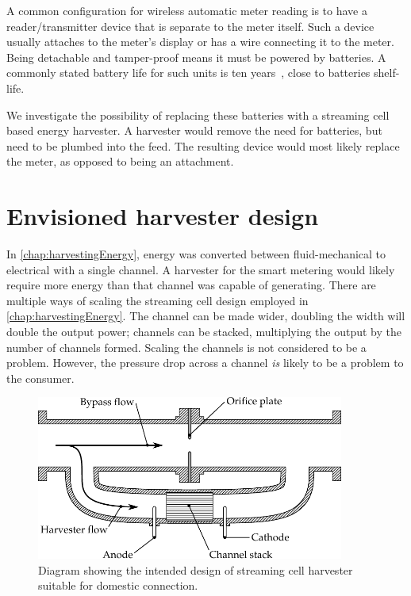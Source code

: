   A common configuration for wireless automatic meter reading is to have a reader/transmitter device that is separate to the meter itself.
  Such a device usually attaches to the meter's display or has a wire connecting it to the meter.
  Being detachable and tamper-proof means it must be powered by batteries.
  A commonly stated battery life for such units is ten years~\cite{BMeters2014}, close to batteries shelf-life.

  We investigate the possibility of replacing these batteries with a streaming cell based energy harvester.
  A harvester would remove the need for batteries, but need to be plumbed into the feed.
  The resulting device would most likely replace the meter, as opposed to being an attachment. 

  \section{Envisioned harvester design}

    In \cref{chap:harvestingEnergy}, energy was converted between fluid-mechanical to electrical with a single channel.
    A harvester for the smart metering would likely require more energy than that channel was capable of generating.
    There are multiple ways of scaling the streaming cell design employed in \cref{chap:harvestingEnergy}.
    The channel can be made wider, doubling the width will double the output power;
    channels can be stacked, multiplying the output by the number of channels formed.
    Scaling the channels is not considered to be a problem.
    However, the pressure drop across a channel \emph{is} likely to be a problem to the consumer.

    \begin{figure}
      \centering
      \includegraphics[width=0.9\textwidth]{content/pt1/02-WirelessWaterMeter/graphics/harvester}
      \caption{\label{fig:Diagram_harvester}Diagram showing the intended design of streaming cell harvester suitable for domestic connection.}
    \end{figure}

